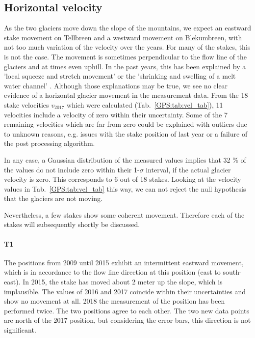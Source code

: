 
\subsection{Horizontal velocity}

As the two glaciers move down the slope of the mountains,
we expect an eastward stake movement on Tellbreen and
a westward movement on Blekumbreen, with not too much variation of the velocity over the years.
For many of the stakes, this is not the case.
The movement is sometimes perpendicular to the flow line of the glaciers
and at times even uphill.
In the past years, this has been explained by a 'local squeeze and stretch movement' \citep{rep2016} or
the 'shrinking and swelling of a melt water channel' \citep{rep2017}.
Although those explanations may be true, we see no clear evidence of a horizontal glacier movement in the measurement data.
From the 18 stake velocities $v_{2017}$ which were calculated (Tab.~\ref{GPS:tab:vel_tab}),
11 velocities include a velocity of zero within their uncertainty.
Some of the 7 remaining velocities which are far from zero could be explained with outliers due to unknown reasons, e.g.
issues with the stake position of last year or a failure of the post processing algorithm.

In any case, a Gaussian distribution of the measured values implies that 32 \% of the values
do not include zero within their 1-$\sigma$ interval, if the actual glacier velocity is zero.
This corresponds to 6 out of 18 stakes.
Looking at the velocity values in Tab.~\ref{GPS:tab:vel_tab} this way, we can not reject the null hypothesis that the glaciers are not moving.

Nevertheless, a few stakes show some coherent movement.
Therefore each of the stakes will subsequently shortly be discussed.

\paragraph{T1}
The positions from 2009 until 2015 exhibit an intermittent eastward movement,
which is in accordance to the flow line direction at this position (east to south-east).
In 2015, the stake has moved about 2 meter up the slope, which is implausible.
The values of 2016 and 2017 coincide within their uncertainties and show no movement at all.
2018 the measurement of the position has been performed twice.
The two positions agree to each other.
The two new data points are north of the 2017 position,
but considering the error bars, this direction is not significant.

